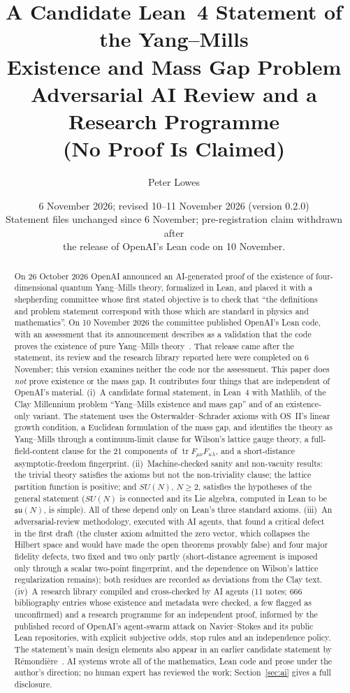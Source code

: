 \documentclass[11pt]{article}
\title{A Candidate Lean~4 Statement of the Yang--Mills\\ Existence and Mass Gap Problem\\[4pt]
\large Adversarial AI Review and a Research Programme\\ (No Proof Is Claimed)}
\author{Peter Lowes}
\date{6 November 2026; revised 10--11 November 2026 \quad (version 0.2.0)\\[2pt]\small Statement files unchanged since 6 November; pre-registration claim withdrawn after\\ the release of OpenAI's Lean code on 10 November.}
\theoremstyle{definition}
\theoremstyle{remark}
\newcommand{\tr}{\operatorname{tr}}
\begin{document}
\maketitle

\begin{abstract}
On 26 October 2026 OpenAI announced an AI-generated proof of the existence of four-dimensional
quantum Yang--Mills theory, formalized in Lean, and placed it with a shepherding committee whose
first stated objective is to check that ``the definitions and problem statement correspond with
those which are standard in physics and mathematics''. On 10 November 2026 the committee published OpenAI's Lean code, with an assessment that
its announcement describes as a validation that the code proves the existence of pure Yang--Mills
theory~\cite{Douglas2026g}. That release came after the statement, its review and the research
library reported here were completed on 6 November; this version examines neither the code nor the
assessment. This paper does \emph{not} prove existence or the
mass gap. It contributes four things that are independent of OpenAI's material.
(i)~A candidate formal statement, in Lean~4 with Mathlib, of the Clay Millennium problem
``Yang--Mills existence and mass gap'' and of an existence-only variant. The statement uses the
Osterwalder--Schrader axioms with OS~II's linear growth condition, a Euclidean formulation of
the mass gap, and identifies the theory as Yang--Mills through a continuum-limit clause for
Wilson's lattice gauge theory, a full-field-content clause for the 21 components of
$\tr F_{\mu\nu}F_{\kappa\lambda}$, and a short-distance asymptotic-freedom fingerprint.
(ii)~Machine-checked sanity and non-vacuity results: the trivial theory satisfies the axioms but
not the non-triviality clause; the lattice partition function is positive; and $SU(N)$,
$N\ge2$, satisfies the hypotheses of the general statement ($SU(N)$ is connected and its Lie
algebra, computed in Lean to be $\mathfrak{su}(N)$, is simple). All of these depend only on
Lean's three standard axioms.
(iii)~An adversarial-review methodology, executed with AI agents, that found a critical defect in
the first draft (the cluster axiom admitted the zero vector, which collapses the Hilbert space
and would have made the open theorems provably false) and four major fidelity defects, two
fixed and two only partly (short-distance agreement is imposed only through a scalar two-point
fingerprint, and the dependence on Wilson's lattice regularization remains); both residues are
recorded as deviations from the Clay text.
(iv)~A research library compiled and cross-checked by AI agents (11 notes; 666 bibliography
entries whose existence and metadata were checked, a few flagged as unconfirmed) and a research programme
for an independent proof, informed by the published record of OpenAI's agent-swarm attack on
Navier--Stokes and its public Lean repositories, with explicit subjective odds, stop rules and
an independence policy. The statement's main design elements also appear in an earlier candidate
statement by R\'emondi\`ere~\cite{Remondiere2026}. AI systems wrote all of the mathematics, Lean
code and prose under the author's direction; no human expert has reviewed the work;
Section~\ref{sec:ai} gives a full disclosure.
\end{abstract}
\end{document}
